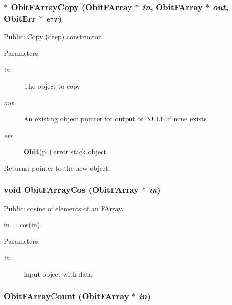 \subsubsection{$\ast$ Obit\-FArray\-Copy ({\bf Obit\-FArray} $\ast$ {\em in}, {\bf Obit\-FArray} $\ast$ {\em out}, {\bf Obit\-Err} $\ast$ {\em err})}\label{ObitFArray_8c_a16}


Public: Copy (deep) constructor. 

\begin{Desc}
\item[Parameters:]
\begin{description}
\item[{\em in}]The object to copy \item[{\em out}]An existing object pointer for output or NULL if none exists. \item[{\em err}]{\bf Obit}{\rm (p.\,\pageref{structObit})} error stack object. \end{description}
\end{Desc}
\begin{Desc}
\item[Returns:]pointer to the new object. \end{Desc}
\subsubsection{\setlength{\rightskip}{0pt plus 5cm}void Obit\-FArray\-Cos ({\bf Obit\-FArray} $\ast$ {\em in})}\label{ObitFArray_8c_a38}


Public: cosine of elements of an FArray. 

in = cos(in). \begin{Desc}
\item[Parameters:]
\begin{description}
\item[{\em in}]Input object with data \end{description}
\end{Desc}
\subsubsection{ Obit\-FArray\-Count ({\bf Obit\-FArray} $\ast$ {\em in})}\label{ObitFArray_8c_a41}


